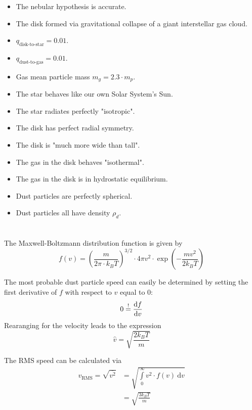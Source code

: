     \begin{itemize}
        \item The nebular hypothesis is accurate. 
        \item The disk formed via gravitational collapse of a giant interstellar gas cloud.
        \item $q_\text{disk-to-star}=0.01$.
        \item $q_\text{dust-to-gas}=0.01$.
        \item Gas mean particle mass $m_g=2.3\cdot m_p$.
        \item The star behaves like our own Solar System's Sun.
        \item The star radiates perfectly "isotropic".
        \item The disk has perfect radial symmetry.
        \item The disk is "much more wide than tall".
        \item The gas in the disk behaves "isothermal".
        \item The gas in the disk is in hydrostatic equilibrium.
        \item Dust particles are perfectly spherical.
        \item Dust particles all have density $\rho_d$.
    \end{itemize}

\section{}

    The Maxwell-Boltzmann distribution function is given by 
    \begin{equation}
        f(v)
        =\left(\frac{m}{2\pi\cdot k_BT}\right)^{3/2}
        \cdot4\pi v^2\cdot\exp\left(-\frac{mv^2}{2k_BT}\right)
    \end{equation}

    The most probable dust particle speed can easily be determined by 
    setting the first derivative of $f$ with respect to $v$ equal to 0:
    \begin{equation}
        0\overset{!}{=}\frac{\text{d} f}{\text{d} v}
    \end{equation}
    Rearanging for the velocity leads to the expression
    \begin{equation}
        \hat{v}=\sqrt{\frac{2k_BT}{m}}
    \end{equation}

    The RMS speed can be calculated via
    \begin{align}
        v_\text{RMS}
        =\sqrt{\overline{v^2}}
        &=\sqrt{\int\limits_0^\infty v^2\cdot f(v)\ \text{d}v}\\
        &=\sqrt{\frac{3k_BT}{m}}
    \end{align}

